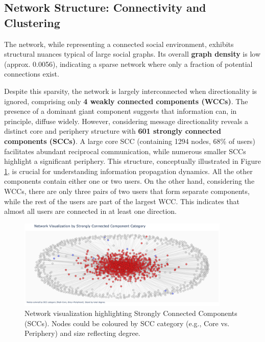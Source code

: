 \subsection{Network Structure: Connectivity and Clustering}
\label{sec:network_structure}

The network, while representing a connected social environment, exhibits structural nuances typical of large social graphs. Its overall \textbf{graph density} is low (approx. 0.0056), indicating a sparse network where only a fraction of potential connections exist.

Despite this sparsity, the network is largely interconnected when directionality is ignored, comprising only \textbf{4 weakly connected components (WCCs)}. The presence of a dominant giant component suggests that information can, in principle, diffuse widely. However, considering message directionality reveals a distinct core and periphery structure with \textbf{601 strongly connected components (SCCs)}. A large core SCC (containing 1294 nodes, 68\% of users) facilitates abundant reciprocal communication, while numerous smaller SCCs highlight a significant periphery. This structure, conceptually illustrated in Figure \ref{fig:scc_visualization}, is crucial for understanding information propagation dynamics. All the other components contain either one or two users. On the other hand, considering the WCCs, there are only three pairs of two users that form separate components, while the rest of the users are part of the largest WCC. This indicates that almost all users are connected in at least one direction.

\begin{figure}[h!]
    \centering
    \includegraphics[width=0.9\textwidth]{../scc.png}
    \caption{Network visualization highlighting Strongly Connected Components (SCCs). Nodes could be coloured by SCC category (e.g., Core vs. Periphery) and size reflecting degree.}
    \label{fig:scc_visualization}
\end{figure}

